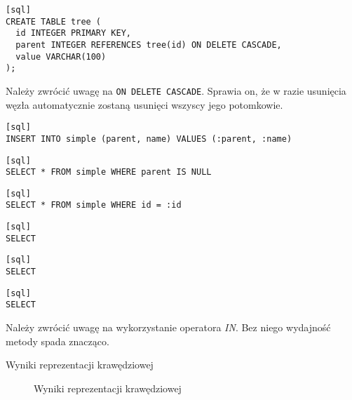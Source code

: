 
\begin{verbatim}[sql]
CREATE TABLE tree (
  id INTEGER PRIMARY KEY,
  parent INTEGER REFERENCES tree(id) ON DELETE CASCADE,
  value VARCHAR(100)
);
\end{verbatim}

Należy zwrócić uwagę na  \texttt{ON DELETE CASCADE}. Sprawia on, że w razie usunięcia węzła  automatycznie zostaną usunięci wszyscy jego potomkowie.


\begin{verbatim}[sql]
INSERT INTO simple (parent, name) VALUES (:parent, :name)
\end{verbatim}


\begin{verbatim}[sql]
SELECT * FROM simple WHERE parent IS NULL
\end{verbatim}




\begin{verbatim}[sql]
SELECT * FROM simple WHERE id = :id
\end{verbatim}



\begin{verbatim}[sql]
SELECT 
\end{verbatim}

\begin{verbatim}[sql]
SELECT 
\end{verbatim}

\begin{verbatim}[sql]
SELECT 
\end{verbatim}

Należy zwrócić uwagę na wykorzystanie operatora \emph{IN}. Bez niego wydajność metody spada znacząco. 


\begin{table}[h!]
  \caption{Wyniki reprezentacji krawędziowej}
  \begin{center}
  \end{center}
\end{table}

\begin{figure}[h!t]
  \caption{Wyniki reprezentacji krawędziowej}
  \label{fig:img_chart_simple}
  \begin{center}
  \end{center}
\end{figure}

\clearpage



